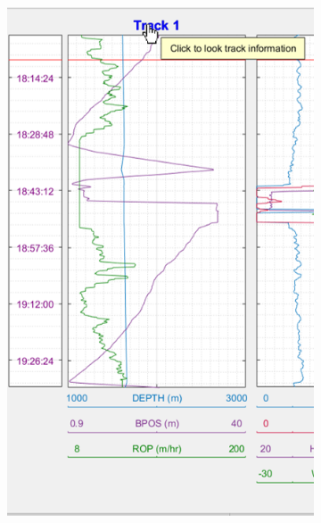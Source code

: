\documentclass[12pt,a4paper,oneside]{report}
\begin{document}
\begin{figure}[H]
\centering
  \begin{subfigure}[b]{0.4\textwidth}
    \includegraphics[width=\textwidth]{fig/track_des_1.png}
    \caption{}
  \end{subfigure}
   \hfill
  \begin{subfigure}[b]{0.55\textwidth}

\end{subfigure}
\end{figure}
\end{document}
